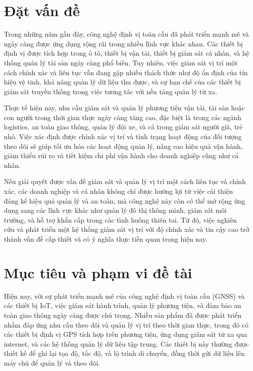 \documentclass[../DoAn.tex]{subfiles}
\begin{document}
\section{Đặt vấn đề}
\label{section:1.1}
Trong những năm gần đây, công nghệ định vị toàn cầu đã phát triển mạnh mẽ và ngày càng được ứng dụng rộng rãi trong nhiều lĩnh vực khác nhau. Các thiết bị định vị được tích hợp trong ô tô, thiết bị vận tải, thiết bị giám sát cá nhân, và hệ thống quản lý tài sản ngày càng phổ biến. Tuy nhiên, việc giám sát vị trí một cách chính xác và liên tục vẫn đang gặp nhiều thách thức như độ ổn định của tín hiệu vệ tinh, khả năng quản lý dữ liệu thu được, và sự hạn chế của các thiết bị giám sát truyền thống trong việc tương tác với nền tảng quản lý từ xa.

Thực tế hiện nay, nhu cầu giám sát và quản lý phương tiện vận tải, tài sản hoặc con người trong thời gian thực ngày càng tăng cao, đặc biệt là trong các ngành logistics, an toàn giao thông, quản lý đội xe, và cả trong giám sát người già, trẻ nhỏ. Việc xác định được chính xác vị trí và tình trạng hoạt động của đối tượng theo dõi sẽ giúp tối ưu hóa các hoạt động quản lý, nâng cao hiệu quả vận hành, giảm thiểu rủi ro và tiết kiệm chi phí vận hành cho doanh nghiệp cũng như cá nhân.

Nếu giải quyết được vấn đề giám sát và quản lý vị trí một cách liên tục và chính xác, các doanh nghiệp và cá nhân không chỉ được hưởng lợi từ việc cải thiện đáng kể hiệu quả quản lý và an toàn, mà công nghệ này còn có thể mở rộng ứng dụng sang các lĩnh vực khác như quản lý đô thị thông minh, giám sát môi trường, và hỗ trợ khẩn cấp trong các tình huống thiên tai. Từ đó, việc nghiên cứu và phát triển một hệ thống giám sát vị trí với độ chính xác và tin cậy cao trở thành vấn đề cấp thiết và có ý nghĩa thực tiễn quan trọng hiện nay.

\section{Mục tiêu và phạm vi đề tài}
\label{section:1.2}
Hiện nay, với sự phát triển mạnh mẽ của công nghệ định vị toàn cầu (GNSS) và các thiết bị IoT, việc giám sát hành trình, quản lý phương tiện, và đảm bảo an toàn giao thông ngày càng được chú trọng. Nhiều sản phẩm đã được phát triển nhằm đáp ứng nhu cầu theo dõi và quản lý vị trí theo thời gian thực, trong đó có các thiết bị định vị GPS tích hợp trên phương tiện, ứng dụng giám sát từ xa qua internet, và các hệ thống quản lý dữ liệu tập trung. Các thiết bị này thường được thiết kế để ghi lại tọa độ, tốc độ, và lộ trình di chuyển, đồng thời gửi dữ liệu lên máy chủ để quản lý và theo dõi.
\end{document}
